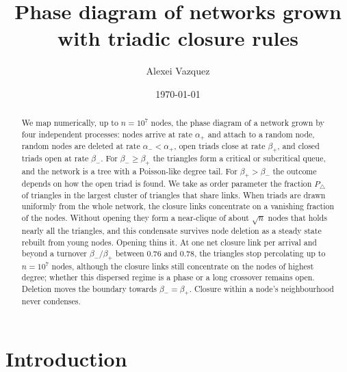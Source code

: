 \documentclass[aps,pre,twocolumn,superscriptaddress,floatfix,nofootinbib]{revtex4-2}
\begin{document}
\title{Phase diagram of networks grown with triadic closure rules}

\author{Alexei Vazquez}

\date{\today}

\begin{abstract}
We map numerically, up to $n=10^7$ nodes, the phase diagram of a network grown
by four independent processes: nodes arrive at rate
$\alpha_+$ and attach to a random node, random nodes are deleted at rate
$\alpha_-<\alpha_+$, open triads close at rate $\beta_+$, and closed triads open
at rate $\beta_-$. For $\beta_-\ge\beta_+$ the triangles form a critical or
subcritical queue, and the network is a tree with a Poisson-like degree tail.
For $\beta_+>\beta_-$ the outcome depends on how the open triad is found. We
take as order parameter the fraction $P_\triangle$ of triangles in the largest
cluster of triangles that share links. When triads are drawn uniformly from the
whole network, the closure links concentrate on a vanishing fraction of the
nodes. Without opening they form a near-clique of about $\sqrt n$ nodes that
holds nearly all the triangles, and this condensate survives node deletion as a
steady state rebuilt from young nodes. Opening thins it. At one net closure
link per arrival and beyond a turnover $\beta_-/\beta_+$ between $0.76$ and
$0.78$, the triangles stop percolating up to $n=10^7$ nodes, although the
closure links still concentrate on the nodes of highest degree; whether this
dispersed regime is a phase or a long crossover remains open. Deletion moves
the boundary towards $\beta_-=\beta_+$. Closure within a node's neighbourhood
never condenses.
\end{abstract}

\maketitle

\section{Introduction}
\end{document}
